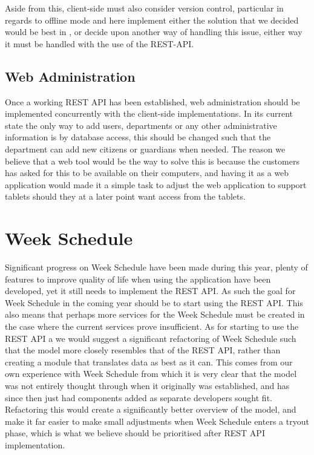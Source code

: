 Aside from this, client-side must also consider version control, particular in regards to offline mode and here implement either the solution that we decided would be best in , or decide upon another way of handling this issue, either way it must be handled with the use of the REST-API.

\subsection{Web Administration}
Once a working REST API has been established, web administration should be implemented concurrently with the client-side implementations.
In its current state the only way to add users, departments or any other administrative information is by database access, this should be changed such that the department can add new citizens or guardians when needed.
The reason we believe that a web tool would be the way to solve this is because the customers has asked for this to be available on their computers, and having it as a web application would made it a simple task to adjust the web application to support tablets should they at a later point want access from the tablets.

\section{Week Schedule}
Significant progress on Week Schedule have been made during this year, plenty of features to improve quality of life when using the application have been developed, yet it still needs to implement the REST API.
As such the goal for Week Schedule in the coming year should be to start using the REST API.
This also means that perhaps more services for the Week Schedule must be created in the case where the current services prove insufficient.
As for starting to use the REST API a we would suggest a significant refactoring of Week Schedule such that the model more closely resembles that of the REST API, rather than creating a module that translates data as best as it can.
This comes from our own experience with Week Schedule from which it is very clear that the model was not entirely thought through when it originally was established, and has since then just had components added as separate developers sought fit.
Refactoring this would create a significantly better overview of the model, and make it far easier to make small adjustments when Week Schedule enters a tryout phase, which is what we believe should be prioritised after REST API implementation.

